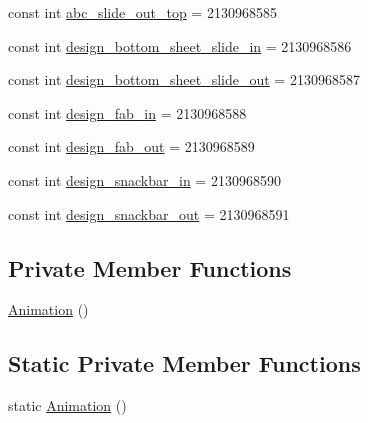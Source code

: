 \begin{DoxyCompactItemize}
\item 
const int \mbox{\hyperlink{class_f_w_p_s___app_1_1_droid_1_1_resource_1_1_animation_a2bb2503f311044e1264b1b6d14264014}{abc\+\_\+slide\+\_\+out\+\_\+top}} = 2130968585
\item 
const int \mbox{\hyperlink{class_f_w_p_s___app_1_1_droid_1_1_resource_1_1_animation_a550a44e80dabb4c97a9507db4faf8748}{design\+\_\+bottom\+\_\+sheet\+\_\+slide\+\_\+in}} = 2130968586
\item 
const int \mbox{\hyperlink{class_f_w_p_s___app_1_1_droid_1_1_resource_1_1_animation_aeb5b706923b00936613a696f83a80e43}{design\+\_\+bottom\+\_\+sheet\+\_\+slide\+\_\+out}} = 2130968587
\item 
const int \mbox{\hyperlink{class_f_w_p_s___app_1_1_droid_1_1_resource_1_1_animation_ad1736f32606dc63899387eece5fae568}{design\+\_\+fab\+\_\+in}} = 2130968588
\item 
const int \mbox{\hyperlink{class_f_w_p_s___app_1_1_droid_1_1_resource_1_1_animation_ac80ae7c8c09125161c18e61864e93905}{design\+\_\+fab\+\_\+out}} = 2130968589
\item 
const int \mbox{\hyperlink{class_f_w_p_s___app_1_1_droid_1_1_resource_1_1_animation_ad8fa2b4e4a1ee0e5be89a917d030480f}{design\+\_\+snackbar\+\_\+in}} = 2130968590
\item 
const int \mbox{\hyperlink{class_f_w_p_s___app_1_1_droid_1_1_resource_1_1_animation_af921152f6499060210280ff88a9a1dc8}{design\+\_\+snackbar\+\_\+out}} = 2130968591
\end{DoxyCompactItemize}
\subsection*{Private Member Functions}
\begin{DoxyCompactItemize}
\item 
\mbox{\hyperlink{class_f_w_p_s___app_1_1_droid_1_1_resource_1_1_animation_acb680ade19c701e9a788fc773b23d17c}{Animation}} ()
\end{DoxyCompactItemize}
\subsection*{Static Private Member Functions}
\begin{DoxyCompactItemize}
\item 
static \mbox{\hyperlink{class_f_w_p_s___app_1_1_droid_1_1_resource_1_1_animation_a4de1520e6cd899d2a675b6335f1b5a38}{Animation}} ()
\end{DoxyCompactItemize}


